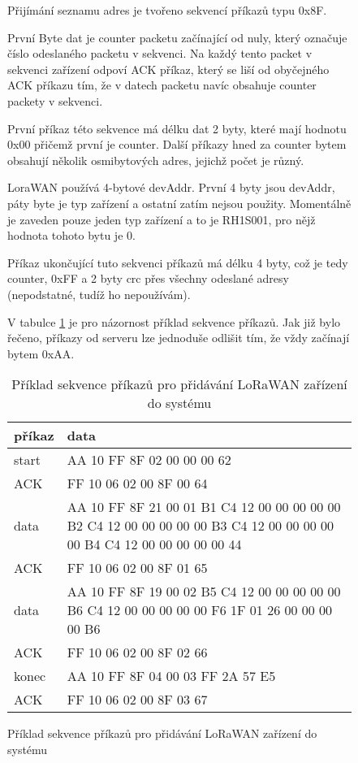 \begin{figure}[!h]
Přijímání seznamu adres je tvořeno sekvencí příkazů typu 0x8F. 

První Byte dat je counter packetu začínající od nuly, který označuje číslo odeslaného packetu v sekvenci. Na každý tento packet v sekvenci zařízení odpoví ACK příkaz, který se liší od obyčejného ACK příkazu tím, že v datech packetu navíc obsahuje counter packety v sekvenci.

První příkaz této sekvence má délku dat 2 byty, které mají hodnotu 0x00 přičemž první je counter.
Další příkazy hned za counter bytem obsahují několik osmibytových adres, jejichž počet je různý.

LoraWAN používá 4-bytové devAddr. První 4 byty jsou devAddr, páty byte je typ zařízení a ostatní zatím nejsou použity. Momentálně je zaveden pouze jeden typ zařízení a to je RH1S001, pro nějž hodnota tohoto bytu je 0.

Příkaz ukončující tuto sekvenci příkazů má délku 4 byty, což je tedy counter, 0xFF a 2 byty crc přes všechny odeslané adresy (nepodstatné, tudíž ho nepoužívám).

V tabulce \ref{table:2} je pro názornost příklad sekvence příkazů. Jak již bylo řečeno, příkazy od serveru lze jednoduše odlišit tím, že vždy začínají bytem 0xAA.

\begin{table}[!h]
    \begin{tabular}{ |l|p{10cm}| }
    \hline
    příkaz      &  data    \\ \hline \hline
    start      &  AA 10 FF 8F 02 00 00 00 62    \\ \hline
    ACK        &  FF 10 06 02 00 8F 00 64    \\ \hline
    data     &  AA 10 FF 8F 21 00 01 B1 C4 12 00 00 00 00 00 B2 C4 12 00 00 00 00 00 B3 C4 12 00 00 00 00 00 B4 C4 12 00 00 00 00 00 44 \\ \hline
    ACK      &  FF 10 06 02 00 8F 01 65   \\ \hline
    data     &  AA 10 FF 8F 19 00 02 B5 C4 12 00 00 00 00 00 B6 C4 12 00 00 00 00 00 F6 1F 01 26 00 00 00 00 B6 \\ \hline
    ACK      &   FF 10 06 02 00 8F 02 66   \\ \hline
    konec      &   AA 10 FF 8F 04 00 03 FF 2A 57 E5   \\ \hline
    ACK      &   FF 10 06 02 00 8F 03 67  \\ \hline
    \end{tabular}
    \caption{Příklad sekvence příkazů pro přidávání LoRaWAN zařízení do systému}
    \label{table:2}
\end{table}



\end{figure}
